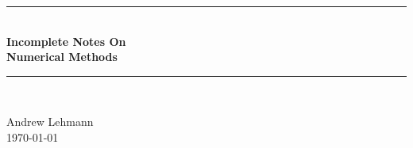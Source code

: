 \thispagestyle{empty}
\begin{titlepage}

\newcommand{\HRule}{\rule{\linewidth}{0.5mm}} %

\center %
 






\HRule \\[0.4cm]
{ \huge \bfseries Incomplete Notes On}\\[0.4cm] %
{ \huge \bfseries Numerical Methods} %
\HRule \\[0.2cm]
 



\begin{minipage}{0.4\textwidth}
\begin{flushleft} \large
\centering Andrew Lehmann \\
\centering \today \\
\end{flushleft}
\end{minipage}

\vfill


\end{titlepage}
